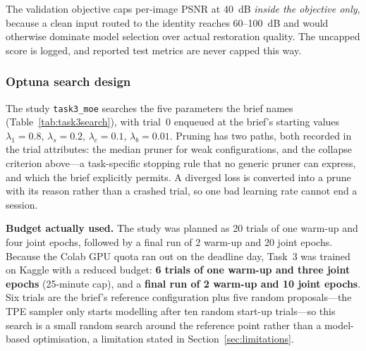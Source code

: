 \documentclass[conference]{IEEEtran}
\begin{document}
The validation objective caps per-image PSNR at 40~dB \emph{inside the objective
only}, because a clean input routed to the identity reaches 60--100~dB and would
otherwise dominate model selection over actual restoration quality. The uncapped
score is logged, and reported test metrics are never capped this way.

\subsubsection{Optuna search design}

The study \texttt{task3\_moe} searches the five parameters the brief names
(Table~\ref{tab:task3search}), with trial~0 enqueued at the brief's starting
values $\lambda_1 = 0.8$, $\lambda_s = 0.2$, $\lambda_c = 0.1$,
$\lambda_b = 0.01$. Pruning has two paths, both recorded in the trial
attributes: the median pruner for weak configurations, and the collapse criterion
above---a task-specific stopping rule that no generic pruner can express, and
which the brief explicitly permits. A diverged loss is converted into a prune with
its reason rather than a crashed trial, so one bad learning rate cannot end a
session.

\textbf{Budget actually used.} The study was planned as 20 trials of one warm-up
and four joint epochs, followed by a final run of 2 warm-up and 20 joint epochs.
Because the Colab GPU quota ran out on the deadline day, Task~3 was trained on
Kaggle with a reduced budget: \textbf{6 trials of one warm-up and three joint
epochs} (25-minute cap), and a \textbf{final run of 2 warm-up and 10 joint
epochs}. Six trials are the brief's reference configuration plus five random
proposals---the TPE sampler only starts modelling after ten random start-up
trials---so this search is a small random search around the reference point
rather than a model-based optimisation, a limitation stated in
Section~\ref{sec:limitations}.
\end{document}
